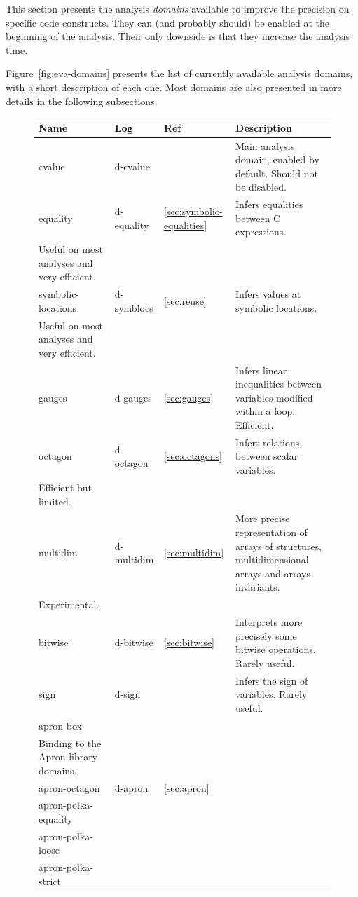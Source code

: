 \documentclass[web]{frama-c-book}
\begin{document}
This section presents the analysis \emph{domains}
available to improve the precision on specific code constructs.
They can (and probably should) be enabled at the beginning of the analysis.
Their only downside is that they increase the analysis time.

Figure~\ref{fig:eva-domains} presents the list of currently available analysis
domains, with a short description of each one.
Most domains are also presented in more details in the following subsections.

\begin{figure}
  \begin{tabular}{lll>{\raggedright}m{7.5cm}}
    Name & Log & Ref & Description\tabularnewline
    \midrule
    \midrule
    cvalue & d-cvalue &  &
    Main analysis domain, enabled by default. Should not be disabled.
    \tabularnewline
    \midrule
    equality & d-equality & \ref{sec:symbolic-equalities} &
    Infers equalities between C expressions. \\
    Useful on most analyses and very efficient.
    \tabularnewline
    \midrule
    symbolic-locations & d-symblocs & \ref{sec:reuse} &
    Infers values at symbolic locations. \\
    Useful on most analyses and very efficient.
    \tabularnewline
    \midrule
    gauges & d-gauges & \ref{sec:gauges} &
    Infers linear inequalities between variables modified within a loop. Efficient.
    \tabularnewline
    \midrule
    octagon & d-octagon & \ref{sec:octagons} &
    Infers relations between scalar variables. \\
    Efficient but limited.
    \tabularnewline
    \midrule
    multidim & d-multidim & \ref{sec:multidim} &
    More precise representation of arrays of structures,
    multidimensional arrays and arrays invariants. \\
    Experimental.
    \tabularnewline
    \midrule
    bitwise & d-bitwise & \ref{sec:bitwise} &
    Interprets more precisely some bitwise operations. Rarely useful.
    \tabularnewline
    \midrule
    sign & d-sign &  &
    Infers the sign of variables. Rarely useful.
    \tabularnewline
    \midrule
    apron-box & \multirow{5}{*}{d-apron} & \multirow{5}{*}{\ref{sec:apron}} &
    \multirow{5}{7.5cm}{Experimental and often costly. \\
      Binding to the Apron library domains.}\tabularnewline
    apron-octagon &  &  & \tabularnewline
    apron-polka-equality &  &  & \tabularnewline
    apron-polka-loose &  &  & \tabularnewline
    apron-polka-strict &  &  & \tabularnewline

\end{tabular}
\end{figure}
\end{document}

